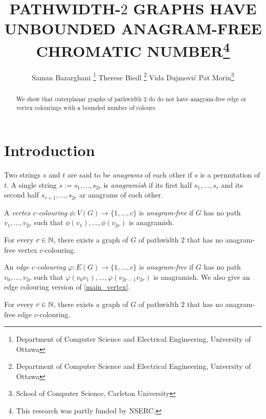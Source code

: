 \documentclass{patmorin}
\title{\MakeUppercase{Pathwidth-$2$ Graphs have Unbounded Anagram-Free Chromatic Number}\thanks{This research was partly funded by NSERC.}}
\author{Saman Bazarghani%
    \thanks{Department of Computer Science and Electrical Engineering, University of Ottawa}\qquad
    Therese Biedl%
    \thanks{Department of Computer Science and Electrical Engineering, University of Ottawa}\qquad
    Vida Dujmović\footnotemark[2]\qquad
    Pat Morin\footnotemark[3]%
    \thanks{School of Computer Science, Carleton University}}
\begin{document}
\maketitle

\begin{abstract}
    We show that outerplanar graphs of pathwidth $2$ do do not have anagram-free edge or vertex colourings with a bounded number of colours.
\end{abstract}

%


\section{Introduction}

Two strings $s$ and $t$ are said to be \emph{anagrams} of each other if $s$ is a permutation of $t$.  A single string $s:=s_1,\ldots,s_{2r}$ is \emph{anagramish} if its first half $s_1,\ldots,s_r$ and its second half $s_{r+1},\ldots,s_{2r}$ ar anagrams of each other.

A \emph{vertex $c$-colouring} $\phi:V(G)\to\{1,\ldots,c\}$ is \emph{anagram-free} if $G$ has no path $v_1,\ldots,v_{2r}$ such that $\phi(v_1),\ldots,\phi(v_{2r})$ is anagramish.



\begin{thm}\label{main_vertex}
    For every $c\in\mathbb{N}$, there exists a graph of $G$ of pathwidth $2$ that has no anagram-free vertex $c$-colouring.
\end{thm}


An \emph{edge $c$-colouring} $\varphi:E(G)\to\{1,\ldots,c\}$ is \emph{anagram-free} if $G$ has no path $v_0,\ldots,v_{2r}$ such that $\varphi(v_0v_1),\ldots,\varphi(v_{2r-1}v_{2r})$ is anagramish.  We also give an edge colouring version of \cref{main_vertex}.

\begin{thm}\label{main_edge}
    For every $c\in\mathbb{N}$, there exists a graph of $G$ of pathwidth $2$ that has no anagram-free edge $c$-colouring.
\end{thm}


\end{document}
